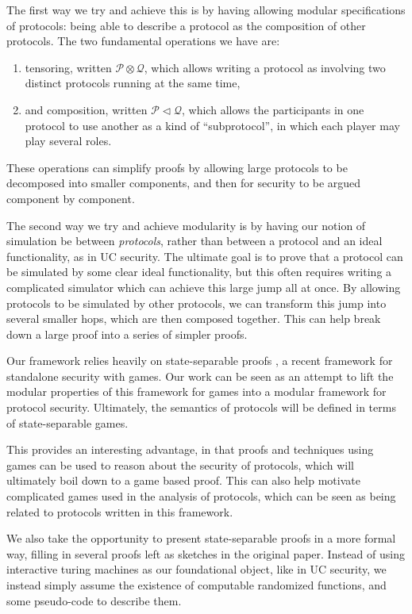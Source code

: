 The first way we try and achieve this is by having allowing
modular specifications of protocols: being able to describe a protocol
as the composition of other protocols.
The two fundamental operations we have are:
\begin{enumerate}
\item tensoring, written $\mathscr{P} \otimes \mathscr{Q}$,
which allows writing a protocol as involving two distinct protocols
running at the same time,
\item and composition, written $\mathscr{P} \lhd \mathscr{Q}$,
which allows the participants in one protocol to use another
as a kind of ``subprotocol'', in which each player may play
several roles.
\end{enumerate}
These operations can simplify proofs by allowing large protocols
to be decomposed into smaller components,
and then for security to be argued component by component.

The second way we try and achieve modularity is by having our
notion of simulation be between \emph{protocols},
rather than between a protocol and an ideal functionality,
as in UC security.
The ultimate goal is to prove that a protocol can be simulated
by some clear ideal functionality,
but this often requires writing a complicated simulator
which can achieve this large jump all at once.
By allowing protocols to be simulated by other protocols,
we can transform this jump into several smaller hops,
which are then composed together.
This can help break down a large proof into a series of simpler proofs.

Our framework relies heavily on state-separable proofs \cite{AC:BDFKK18},
a recent framework for standalone security with games.
Our work can be seen as an attempt to lift the modular
properties of this framework for games into a modular
framework for protocol security.
Ultimately, the semantics of protocols will be defined in terms
of state-separable games.

This provides an interesting advantage, in that proofs
and techniques using games can be used to reason
about the security of protocols, which will ultimately
boil down to a game based proof.
This can also help motivate complicated games used in the analysis
of protocols, which can be seen as being related to protocols
written in this framework.

We also take the opportunity to present state-separable proofs
in a more formal way, filling in several proofs left as sketches
in the original paper.
Instead of using interactive turing machines as our foundational
object, like in UC security,
we instead simply assume the existence of computable randomized functions,
and some pseudo-code to describe them.

